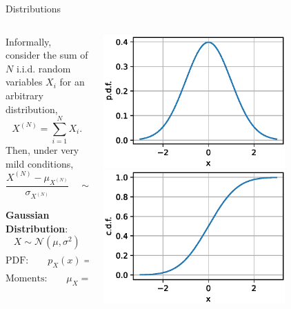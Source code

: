 {\begin{frame}{Distributions}
\begin{columns}[onlytextwidth]
\begin{column}{0.5\textwidth}
                Informally, consider the sum of $N$ i.i.d. random variables $X_i$ for an arbitrary distribution,
                $$
                    X^{(N)} = \sum_{i=1}^N X_i.
                $$
                Then, under very mild conditions,
                $$
                    \frac{X^{(N)} - \mu_{X^{(N)}}}{\sigma_{X^{(N)}}} \quad \sim \quad \text{approximately Gaussian}
                $$

                \begin{boxed}
                    \textbf{Gaussian Distribution}:
                    $$X \sim \mathcal{N}(\mu, \sigma^2)$$
                    $$\text{PDF:}\qquad p_X(x) = \frac{1}{\sqrt{2\pi}\sigma}e^{-\frac{(x-\mu)^2}{2\sigma^2}}$$
                    $$\text{Moments:}\qquad \displaystyle \mu_X = \mu \quad \sigma_X^2 = \sigma^2$$
                \end{boxed}

            \end{column}
            \begin{column}{0.5\textwidth}
                \begin{center}
                    \includegraphics[width=0.73\textwidth]{fig/prob_norm_pdf.eps}
                    \qquad
                    \includegraphics[width=0.73\textwidth]{fig/prob_norm_cdf.eps}
                \end{center}


\end{column}
\end{columns}
\end{frame}}
